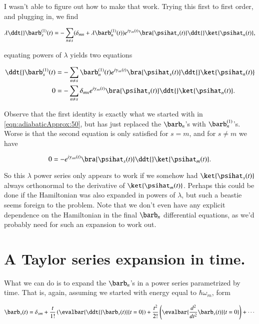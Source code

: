 I wasn't able to figure out how to make that work.  Trying this first to first order, and plugging in, we find

\begin{equation}\label{eqn:adiabaticApprox:170}
\lambda \ddt{} \barb^{(1)}_s(t) = - \sum_{n \ne s} ( \delta_{mn} + \lambda \barb^{(1)}_n(t) ) 
e^{i \gamma_{sn}(t) } \bra{\psihat_s(t)} \ddt{} \ket{\psihat_n(t)},
\end{equation}

equating powers of $\lambda$ yields two equations

\begin{align}\label{eqn:adiabaticApprox:190}
\ddt{} \barb_s^{(1)}(t) &= - \sum_{n \ne s} \barb^{(1)}_n(t) e^{i \gamma_{sn}(t) } \bra{\psihat_s(t)} \ddt{} \ket{\psihat_n(t)} \\
0 &= - \sum_{n \ne s} \delta_{mn} e^{i \gamma_{sn}(t) } \bra{\psihat_s(t)} \ddt{} \ket{\psihat_n(t)}.
\end{align}

Observe that the first identity is exactly what we started with in \ref{eqn:adiabaticApprox:50}, but has just replaced the $\barb_n$'s with $\barb^{(1)}_n$'s.  Worse is that the second equation is only satisfied for $s = m$, and for $s \ne m$ we have

\begin{equation}\label{eqn:adiabaticApprox:210}
0 = - e^{i \gamma_{sm}(t) } \bra{\psihat_s(t)} \ddt{} \ket{\psihat_m(t)}.
\end{equation}

So this $\lambda$ power series only appears to work if we somehow had $\ket{\psihat_s(t)}$ always orthonormal to the derivative of $\ket{\psihat_m(t)}$.  Perhaps this could be done if the Hamiltonian was also expanded in powers of $\lambda$, but such a beastie seems foreign to the problem.  Note that we don't even have any explicit dependence on the Hamiltonian in the final $\barb_n$ differential equations, as we'd probably need for such an expansion to work out.

\section{A Taylor series expansion in time.}

What we can do is to expand the $\barb_n$'s in a power series parametrized by time.  That is, again, assuming we started with energy equal to $\hbar \omega_m$, form

\begin{equation}\label{eqn:adiabaticApprox:230}
\barb_s(t) 
= \delta_{sm} 
+ \frac{t}{1!} \left( \evalbar{ \ddt{}\barb_s(t) }{t=0} \right)
+ \frac{t^2}{2!} \left( \evalbar{ \frac{d^2}{dt^2} \barb_s(t) }{t=0} \right)
+ \cdots
\end{equation}


